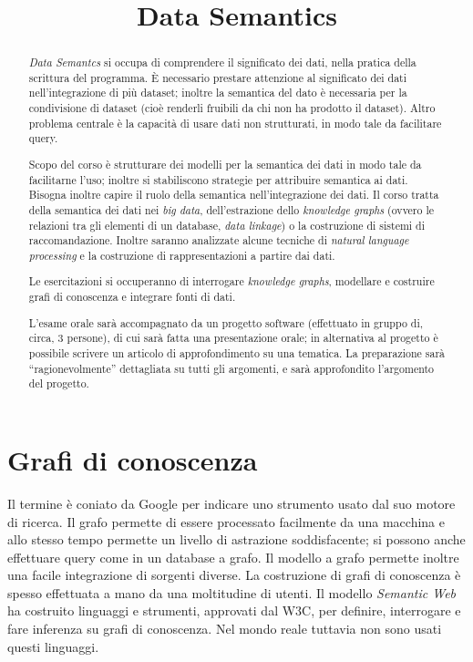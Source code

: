 \documentclass[11pt, twocolumn]{article}
\title{\textbf{Data Semantics}}
\author{}
\date{}
\begin{document}
\maketitle
\begin{abstract}
  \textit{Data Semantcs} si occupa di comprendere il significato dei dati, nella pratica della scrittura del programma.
  È necessario prestare attenzione al significato dei dati nell'integrazione di più dataset; inoltre la semantica del dato è necessaria per la condivisione di dataset (cioè renderli fruibili da chi non ha prodotto il dataset).
  Altro problema centrale è la capacità di usare dati non strutturati, in modo tale da facilitare query.
  
  Scopo del corso è strutturare dei modelli per la semantica dei dati in modo tale da facilitarne l'uso; inoltre si stabiliscono strategie per attribuire semantica ai dati.
  Bisogna inoltre capire il ruolo della semantica nell'integrazione dei dati.
  Il corso tratta della semantica dei dati nei \textit{big data}, dell'estrazione dello \textit{knowledge graphs} (ovvero le relazioni tra gli elementi di un database, \textit{data linkage}) o la costruzione di sistemi di raccomandazione.
  Inoltre saranno analizzate alcune tecniche di \textit{natural language processing} e la costruzione di rappresentazioni a partire dai dati.

  Le esercitazioni si occuperanno di interrogare \textit{knowledge graphs}, modellare e costruire grafi di conoscenza e integrare fonti di dati.

  L'esame orale sarà accompagnato da un progetto software (effettuato in gruppo di, circa, 3 persone), di cui sarà fatta una presentazione orale; in alternativa al progetto è possibile scrivere un articolo di approfondimento su una tematica.
  La preparazione sarà ``ragionevolmente'' dettagliata su tutti gli argomenti, e sarà approfondito l'argomento del progetto.
\end{abstract}


\newpage
\part{Grafi di conoscenza}
Il termine è coniato da Google per indicare uno strumento usato dal suo motore di ricerca.
Il grafo permette di essere processato facilmente da una macchina e allo stesso tempo permette un livello di astrazione soddisfacente; si possono anche effettuare query come in un database a grafo.
Il modello a grafo permette inoltre una facile integrazione di sorgenti diverse.
La costruzione di grafi di conoscenza è spesso effettuata a mano da una moltitudine di utenti.
Il modello \textit{Semantic Web} ha costruito linguaggi e strumenti, approvati dal W3C, per definire, interrogare e fare inferenza su grafi di conoscenza.
Nel mondo reale tuttavia non sono usati questi linguaggi.
\end{document}
